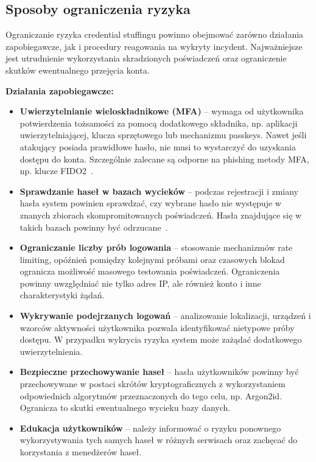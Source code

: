 \documentclass[12pt,a4paper]{article}
\begin{document}
\subsection{Sposoby ograniczenia ryzyka}

Ograniczanie ryzyka credential stuffingu powinno obejmować zarówno działania zapobiegawcze, jak i procedury reagowania na wykryty incydent. Najważniejsze jest utrudnienie wykorzystania skradzionych poświadczeń oraz ograniczenie skutków ewentualnego przejęcia konta.

\textbf{Działania zapobiegawcze:}

\begin{itemize}
    \item \textbf{Uwierzytelnianie wieloskładnikowe (MFA)} -- wymaga od użytkownika potwierdzenia tożsamości za pomocą dodatkowego składnika, np. aplikacji uwierzytelniającej, klucza sprzętowego lub mechanizmu passkeys. Nawet jeśli atakujący posiada prawidłowe hasło, nie musi to wystarczyć do uzyskania dostępu do konta. Szczególnie zalecane są odporne na phishing metody MFA, np. klucze FIDO2~\cite{owasp_mfa}.

    \item \textbf{Sprawdzanie haseł w bazach wycieków} -- podczas rejestracji i zmiany hasła system powinien sprawdzać, czy wybrane hasło nie występuje w znanych zbiorach skompromitowanych poświadczeń. Hasła znajdujące się w takich bazach powinny być odrzucane~\cite{nist80063b}.

    \item \textbf{Ograniczanie liczby prób logowania} -- stosowanie mechanizmów rate limiting, opóźnień pomiędzy kolejnymi próbami oraz czasowych blokad ogranicza możliwość masowego testowania poświadczeń. Ograniczenia powinny uwzględniać nie tylko adres IP, ale również konto i inne charakterystyki żądań.

    \item \textbf{Wykrywanie podejrzanych logowań} -- analizowanie lokalizacji, urządzeń i wzorców aktywności użytkownika pozwala identyfikować nietypowe próby dostępu. W przypadku wykrycia ryzyka system może zażądać dodatkowego uwierzytelnienia.

    \item \textbf{Bezpieczne przechowywanie haseł} -- hasła użytkowników powinny być przechowywane w postaci skrótów kryptograficznych z wykorzystaniem odpowiednich algorytmów przeznaczonych do tego celu, np. Argon2id. Ogranicza to skutki ewentualnego wycieku bazy danych.

    \item \textbf{Edukacja użytkowników} -- należy informować o ryzyku ponownego wykorzystywania tych samych haseł w różnych serwisach oraz zachęcać do korzystania z menedżerów haseł.
\end{itemize}
\end{document}
